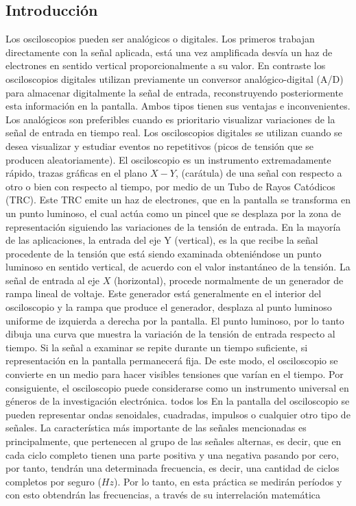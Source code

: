 \documentclass[11pt]{article}
\begin{document}
\begin{multicols}{2}
\section{Introducción}
	Los osciloscopios pueden ser analógicos o digitales. Los primeros trabajan directamente con la señal aplicada, está una vez amplificada desvía un haz de electrones en sentido vertical proporcionalmente a su valor. En contraste los osciloscopios digitales utilizan previamente un conversor analógico-digital (A/D) para almacenar digitalmente la señal de entrada, reconstruyendo posteriormente esta información en la pantalla.
	Ambos tipos tienen sus ventajas e inconvenientes. Los analógicos son preferibles cuando es prioritario visualizar variaciones de la señal de entrada en tiempo real. Los osciloscopios digitales se utilizan cuando se desea visualizar y estudiar eventos no repetitivos (picos de tensión que se producen aleatoriamente).
	El osciloscopio es un instrumento extremadamente rápido, trazas gráficas en el plano $X-Y$, (carátula) de una señal con respecto a otro o bien con respecto al tiempo, por medio de un Tubo de Rayos Catódicos (TRC). Este TRC emite un haz de electrones, que en la pantalla se transforma en un punto luminoso, el cual actúa como un pincel que se desplaza por la zona de representación siguiendo las variaciones de la tensión de entrada. En la mayoría de las aplicaciones, la entrada del eje Y (vertical), es la que recibe la señal procedente de la tensión que está siendo examinada obteniéndose un punto luminoso en sentido vertical, de acuerdo con el valor instantáneo de la tensión. La señal de entrada al eje $X$ (horizontal), procede normalmente de un generador de rampa lineal de voltaje. Este generador está generalmente en el interior del osciloscopio y la rampa que produce el generador, desplaza al punto luminoso uniforme de izquierda a derecha por la pantalla. El punto luminoso, por lo tanto dibuja una curva que muestra la variación de la tensión de entrada respecto al tiempo.
	Si la señal a examinar se repite durante un tiempo suficiente, si representación en la pantalla permanecerá fija. De este modo, el osciloscopio se convierte en un medio para hacer visibles tensiones que varían en el tiempo. Por consiguiente, el osciloscopio puede considerarse como un instrumento universal en géneros de la investigación electrónica. todos los
	En la pantalla del osciloscopio se pueden representar ondas senoidales, cuadradas, impulsos o cualquier otro tipo de señales. La característica más importante de las señales mencionadas es principalmente, que pertenecen al grupo de las señales alternas, es decir, que en cada ciclo completo tienen una parte positiva y una negativa pasando por cero, por tanto, tendrán una determinada frecuencia, es decir, una cantidad de ciclos completos por seguro ($Hz$). Por lo tanto, en esta práctica se medirán períodos y con esto obtendrán las frecuencias, a través de su interrelación matemática


\end{multicols}
\end{document}
